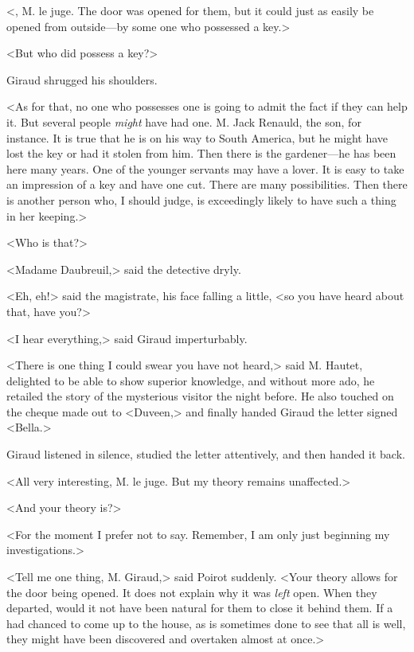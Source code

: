  <, M. le juge. The door was opened for them, but it could just as easily be opened from outside—by some one who possessed a key.> 

 <But who did possess a key?> 

 Giraud shrugged his shoulders. 

 <As for that, no one who possesses one is going to admit the fact if they can help it. But several people \emph{might} have had one. M. Jack Renauld, the son, for instance. It is true that he is on his way to South America, but he might have lost the key or had it stolen from him. Then there is the gardener—he has been here many years. One of the younger servants may have a lover. It is easy to take an impression of a key and have one cut. There are many possibilities. Then there is another person who, I should judge, is exceedingly likely to have such a thing in her keeping.> 

 <Who is that?> 

 <Madame Daubreuil,> said the detective dryly. 

 <Eh, eh!> said the magistrate, his face falling a little, <so you have heard about that, have you?> 

 <I hear everything,> said Giraud imperturbably. 

 <There is one thing I could swear you have not heard,> said M. Hautet, delighted to be able to show superior knowledge, and without more ado, he retailed the story of the mysterious visitor the night before. He also touched on the cheque made out to <Duveen,> and finally handed Giraud the letter signed <Bella.> 

 Giraud listened in silence, studied the letter attentively, and then handed it back. 

 <All very interesting, M. le juge. But my theory remains unaffected.> 

 <And your theory is?> 

 <For the moment I prefer not to say. Remember, I am only just beginning my investigations.> 

 <Tell me one thing, M. Giraud,> said Poirot suddenly. <Your theory allows for the door being opened. It does not explain why it was \emph{left} open. When they departed, would it not have been natural for them to close it behind them. If a  had chanced to come up to the house, as is sometimes done to see that all is well, they might have been discovered and overtaken almost at once.> 


